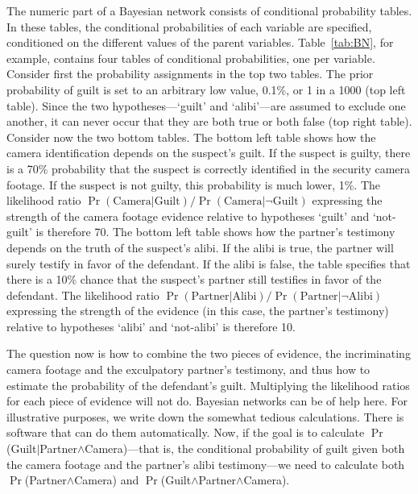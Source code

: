 \documentclass[10pt]{article}
\begin{document}
The numeric part of a Bayesian network consists of conditional probability tables. In these tables, 
the conditional probabilities of each variable are
specified, conditioned on the different values of the parent variables. %
Table~\ref{tab:BN}, for example, contains four tables of conditional probabilities, one per variable. 
Consider first the probability assignments in the top two tables. The prior probability of guilt 
is set to an arbitrary low value, 0.1\%, or 1 in a 1000 (top left table). 
Since the two hypotheses---`guilt' and `alibi'---are assumed to exclude one another, 
it can never occur that they are both true or both false (top right table). Consider now the two bottom tables. 
The bottom left table shows how the camera identification depends on the suspect's guilt. If the suspect is guilty, 
there is a 70\% probability that the suspect is correctly identified in the security camera footage. 
If the suspect is not guilty, this probability is much lower, 1\%. The likelihood ratio $\Pr(\text{Camera} | \text{Guilt})/\Pr(\text{Camera} | \neg \text{Guilt})$ 
expressing the strength of the camera footage evidence relative to hypotheses `guilt' and `not-guilt' 
is therefore 70.
The bottom left table shows how the partner's testimony depends on the truth of the suspect's alibi.
If the alibi is true, the partner will surely testify in favor of the defendant. If the alibi is false, the table specifies that there is a 10\% chance that 
the suspect's partner still testifies in favor of the defendant. The likelihood ratio $\Pr(\text{Partner} | \text{Alibi})/\Pr(\text{Partner} | \neg \text{Alibi})$ 
expressing the strength of the evidence (in this case, the partner's testimony) relative to hypotheses `alibi' and `not-alibi' 
is therefore 10.

The question now is how to combine the two pieces of evidence, the incriminating camera footage and the exculpatory partner's testimony, 
and thus how to estimate the probability of the defendant's guilt. Multiplying the likelihood 
ratios for each piece of evidence will not do. 
Bayesian networks can be of help here. For illustrative purposes, we write down the somewhat tedious calculations.
There is software that can do them automatically. 
Now, if the goal is to calculate $\Pr$(Guilt$|$Partner$ \land $Camera)---that is, the conditional probability of guilt given 
both the camera footage and the partner's alibi testimony---we need to calculate both $\Pr$(Partner$ \land $Camera) 
and $\Pr$(Guilt$ \land $Partner$ \land $Camera). 
\end{document}
